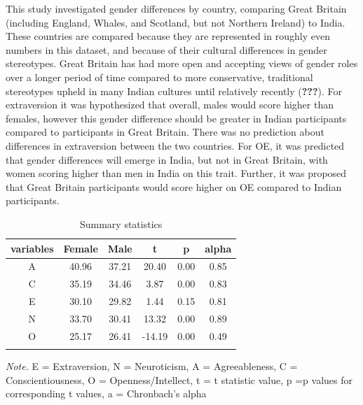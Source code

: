 \documentclass[
  english,
  man]{apa6}
\begin{document}
This study investigated gender differences by country, comparing Great Britain (including England, Whales, and Scotland, but not Northern Ireland) to India. These countries are compared because they are represented in roughly even numbers in this dataset, and because of their cultural differences in gender stereotypes. Great Britain has had more open and accepting views of gender roles over a longer period of time compared to more conservative, traditional stereotypes upheld in many Indian cultures until relatively recently ({\textbf{???}}). For extraversion it was hypothesized that overall, males would score higher than females, however this gender difference should be greater in Indian participants compared to participants in Great Britain. There was no prediction about differences in extraversion between the two countries. For OE, it was predicted that gender differences will emerge in India, but not in Great Britain, with women scoring higher than men in India on this trait. Further, it was proposed that Great Britain participants would score higher on OE compared to Indian participants.

\begin{table}[tbp]

\begin{center}
\begin{threeparttable}

\caption{\label{tab:descriptiveTable}Summary statistics}

\begin{tabular}{cccccc}
\toprule
variables & \multicolumn{1}{c}{Female} & \multicolumn{1}{c}{Male} & \multicolumn{1}{c}{t} & \multicolumn{1}{c}{p} & \multicolumn{1}{c}{alpha}\\
\midrule
A & 40.96 & 37.21 & 20.40 & 0.00 & 0.85\\
C & 35.19 & 34.46 & 3.87 & 0.00 & 0.83\\
E & 30.10 & 29.82 & 1.44 & 0.15 & 0.81\\
N & 33.70 & 30.41 & 13.32 & 0.00 & 0.89\\
O & 25.17 & 26.41 & -14.19 & 0.00 & 0.49\\
\bottomrule
\addlinespace
\end{tabular}

\begin{tablenotes}[para]
\normalsize{\textit{Note.} E = Extraversion, N = Neuroticism, A = Agreeableness, C = Conscientiousness, O = Openness/Intellect, t = t statistic value, p =p values for corresponding t values, a = Chronbach's alpha}
\end{tablenotes}

\end{threeparttable}
\end{center}

\end{table}
\end{document}
